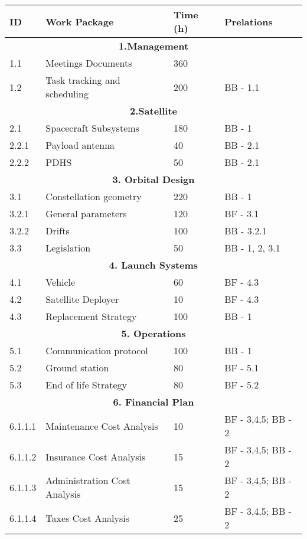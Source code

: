 \begin{longtable}{ | p{1.3cm} | p{7cm} | p{3cm} | p{3.5cm} |}
\hline

\textbf{ID }& \textbf{Work Package} & \textbf{Time (h)} & \textbf{Prelations} \\ \hline
\multicolumn{4}{|c|}{\textbf{1.Management}} \\ \hline
1.1 & Meetings Documents & 360 &   \\ \hline
1.2 & Task tracking and scheduling & 200 & BB - 1.1 \\ \hline
\multicolumn{4}{|c|}{\textbf{2.Satellite}} \\ \hline
2.1 & Spacecraft Subsystems & 180 & BB - 1 \\ \hline
2.2.1 & Payload antenna & 40 & BB - 2.1 \\ \hline
2.2.2 & PDHS & 50 & BB - 2.1 \\ \hline
\multicolumn{4}{|c|}{\textbf{3. Orbital Design}} \\ \hline
3.1 & Constellation geometry & 220 & BB - 1 \\ \hline
3.2.1 & General parameters & 120 & BF - 3.1 \\ \hline
3.2.2 & Drifts & 100 & BB - 3.2.1 \\ \hline
3.3 & Legislation & 50 & BB - 1, 2, 3.1\\ \hline
\multicolumn{4}{|c|}{\textbf{4. Launch Systems}} \\ \hline
4.1 & Vehicle & 60 & BF - 4.3 \\ \hline
4.2 & Satellite Deployer & 10 & BF - 4.3  \\ \hline
4.3 & Replacement Strategy & 100 & BB - 1  \\ \hline
\multicolumn{4}{|c|}{\textbf{5. Operations}} \\ \hline
5.1 & Communication protocol & 100 & BB - 1 \\ \hline
5.2 & Ground station & 80 & BF - 5.1 \\ \hline
5.3 & End of life Strategy & 80 & BF - 5.2 \\
\hline
\multicolumn{4}{|c|}{\textbf{6. Financial Plan}} \\ \hline
6.1.1.1 & Maintenance Cost Analysis & 10 & BF - 3,4,5; BB - 2 \\ \hline
6.1.1.2 & Insurance Cost Analysis & 15 & BF - 3,4,5; BB - 2  \\ \hline
6.1.1.3 & Administration Cost Analysis & 15 & BF - 3,4,5; BB - 2 \\ \hline
6.1.1.4 & Taxes Cost Analysis  & 25 & BF - 3,4,5; BB - 2 \\ \hline

\end{longtable}
